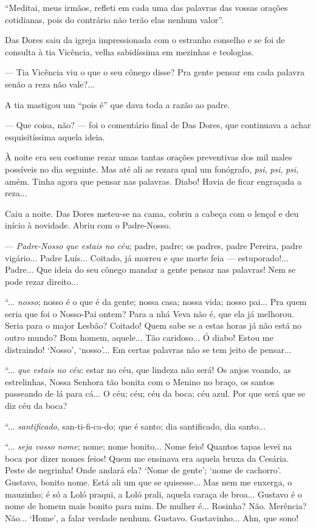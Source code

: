 ``Meditai, meus irmãos, refleti em cada uma das palavras das vossas
orações cotidianas, pois do contrário não terão elas nenhum valor''.

Das Dores saiu da igreja impressionada com o estranho conselho e se foi
de consulta à tia Vicência, velha sabidíssima em mezinhas e teologias.

--- Tia Vicência viu o que o seu cônego disse? Pra gente pensar em cada
palavra senão a reza não vale?...

A tia mastigou um ``pois é'' que dava toda a razão ao padre.

--- Que coisa, não? --- foi o comentário final de Das Dores, que
continuava a achar esquisitíssima aquela ideia.

À noite era seu costume rezar umas tantas orações preventivas dos mil
males possíveis no dia seguinte. Mas até ali as rezara qual um
fonógrafo, \emph{psi}, \emph{psi}, \emph{psi}, amém. Tinha agora que
pensar nas palavras. Diabo! Havia de ficar engraçada a reza...

Caiu a noite. Das Dores meteu-se na cama, cobriu a cabeça com o lençol e
deu início à novidade. Abriu com o Padre-Nosso.

--- \emph{Padre-Nosso que estais no céu}; padre, padre; os padres, padre
Pereira, padre vigário... Padre Luís... Coitado, já morreu e que morte
feia --- estuporado!... Padre... Que ideia do seu cônego mandar a gente
pensar nas palavras! Nem se pode rezar direito...

``... \emph{nosso}; nosso é o que é da gente; nossa casa; nossa vida;
nosso pai... Pra quem seria que foi o Nosso-Pai ontem? Para a nhá Veva
não é, que ela já melhorou. Seria para o major Lesbão? Coitado! Quem
sabe se a estas horas já não está no outro mundo? Bom homem, aquele...
Tão caridoso... Ó diabo! Estou me distraindo! `Nosso', `nosso'... Em
certas palavras não se tem jeito de pensar...

``... \emph{que estais no céu}: estar no céu, que lindeza não será! Os
anjos voando, as estrelinhas, Nossa Senhora tão bonita com o Menino no
braço, os santos passeando de lá para cá... O céu; céu; céu da boca; céu
azul. Por que será que se diz céu da boca?

``... \emph{santificado}, san-ti-fi-ca-do; que é santo; dia santificado,
dia santo...

``... \emph{seja vosso nome}; nome; nome bonito... Nome feio! Quantos
tapas levei na boca por dizer nomes feios! Quem me ensinava era aquela
bruxa da Cesária. Peste de negrinha! Onde andará ela? `Nome de gente';
`nome de cachorro'. Gustavo, bonito nome. Está ali um que se quisesse...
Mas nem me enxerga, o mauzinho; é só a Loló praqui, a Loló prali, aquela
caraça de broa... Gustavo é o nome de homem mais bonito para mim. De
mulher é... Rosinha? Não. Merência? Não... `Home', a falar verdade
nenhum. Gustavo. Gustavinho... Ahn, que sono!

